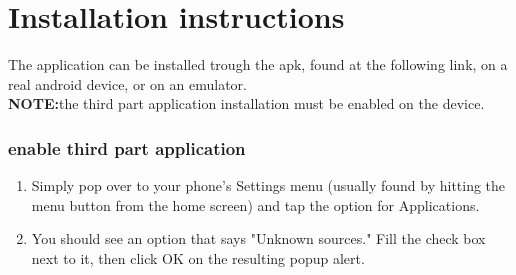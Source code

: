 \chapter{Installation instructions}

The application can be installed trough the apk, found at the following link, on a real android device, or on an emulator. \\
\textbf{NOTE:}the third part application installation must be enabled on the device.

\subsection{enable third part application}
\begin{enumerate}
\item Simply pop over to your phone's Settings menu (usually found by hitting the menu button from the home screen) and tap the option for Applications.
\item You should see an option that says "Unknown sources." Fill the check box next to it, then click OK on the resulting popup alert.
\end{enumerate}

